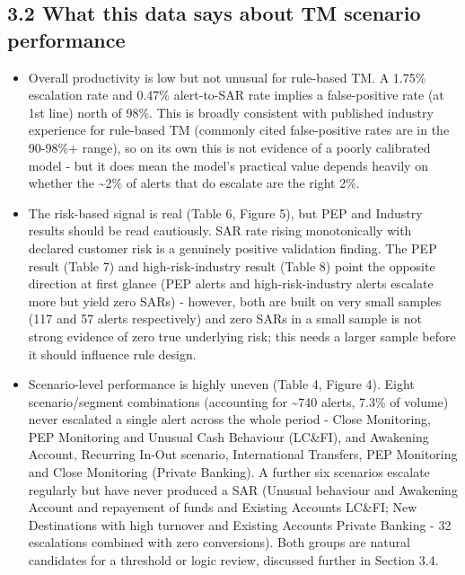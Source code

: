 \documentclass[
]{article}
\begin{document}
\subsection{3.2 What this data says about TM scenario
performance}\label{what-this-data-says-about-tm-scenario-performance}

\begin{itemize}
\item
  Overall productivity is low but not unusual for rule-based TM. A
  1.75\% escalation rate and 0.47\% alert-to-SAR rate implies a
  false-positive rate (at 1st line) north of 98\%. This is broadly
  consistent with published industry experience for rule-based TM
  (commonly cited false-positive rates are in the 90-98\%+ range), so on
  its own this is not evidence of a poorly calibrated model - but it
  does mean the model's practical value depends heavily on whether the
  \textasciitilde2\% of alerts that do escalate are the right 2\%.
\item
  The risk-based signal is real (Table 6, Figure 5), but PEP and
  Industry results should be read cautiously. SAR rate rising
  monotonically with declared customer risk is a genuinely positive
  validation finding. The PEP result (Table 7) and high-risk-industry
  result (Table 8) point the opposite direction at first glance (PEP
  alerts and high-risk-industry alerts escalate more but yield zero
  SARs) - however, both are built on very small samples (117 and 57
  alerts respectively) and zero SARs in a small sample is not strong
  evidence of zero true underlying risk; this needs a larger sample
  before it should influence rule design.
\item
  Scenario-level performance is highly uneven (Table 4, Figure 4). Eight
  scenario/segment combinations (accounting for \textasciitilde740
  alerts, 7.3\% of volume) never escalated a single alert across the
  whole period - Close Monitoring, PEP Monitoring and Unusual Cash
  Behaviour (LC\&FI), and Awakening Account, Recurring In-Out scenario,
  International Transfers, PEP Monitoring and Close Monitoring (Private
  Banking). A further six scenarios escalate regularly but have never
  produced a SAR (Unusual behaviour and Awakening Account and repayement
  of funds and Existing Accounts LC\&FI; New Destinations with high
  turnover and Existing Accounts Private Banking - 32 escalations
  combined with zero conversions). Both groups are natural candidates
  for a threshold or logic review, discussed further in Section 3.4.
\end{itemize}
\end{document}
